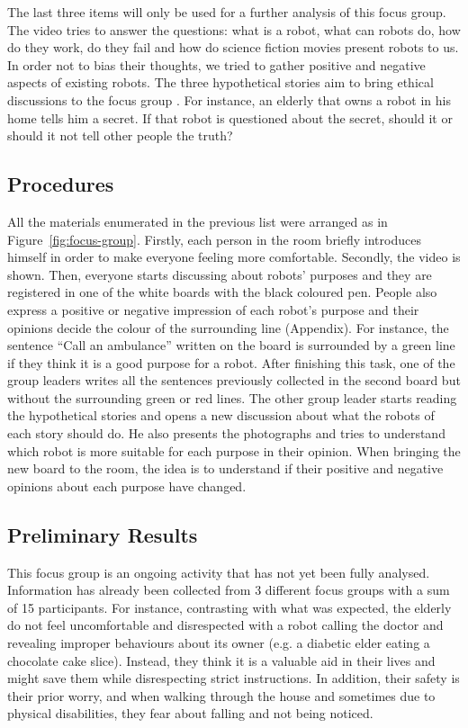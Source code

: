 The last three items will only be used for a further analysis of this focus group.
The video tries to answer the questions: what is a robot, what can robots do, how do they work, do they fail and how do science fiction movies present robots to us.
In order not to bias their thoughts, we tried to gather positive and negative aspects of existing robots.
The three hypothetical stories aim to bring ethical discussions to the focus group \cite{Kahn2006,Should2010}.
For instance, an elderly that owns a robot in his home tells him a secret.
If that robot is questioned about the secret, should it or should it not tell other people the truth?

\subsection{Procedures}
All the materials enumerated in the previous list were arranged as in Figure~\ref{fig:focus-group}.
Firstly, each person in the room briefly introduces himself in order to make everyone feeling more comfortable.
Secondly, the video is shown.
Then, everyone starts discussing about robots' purposes and they are registered in one of the white boards with the black coloured pen.
People also express a positive or negative impression of each robot's purpose and their opinions decide the colour of the surrounding line (Appendix).
For instance, the sentence ``Call an ambulance'' written on the board is surrounded by a green line if they think it is a good purpose for a robot.
After finishing this task, one of the group leaders writes all the sentences previously collected in the second board but without the surrounding green or red lines.
The other group leader starts reading the hypothetical stories and opens a new discussion about what the robots of each story should do.
He also presents the photographs and tries to understand which robot is more suitable for each purpose in their opinion.
When bringing the new board to the room, the idea is to understand if their positive and negative opinions about each purpose have changed.


\subsection{Preliminary Results}

This focus group is an ongoing activity that has not yet been fully analysed.
Information has already been collected from 3 different focus groups with a sum of 15 participants.
For instance, contrasting with what was expected, the elderly do not feel uncomfortable and disrespected with a robot calling the doctor and revealing improper behaviours about its owner (e.g. a diabetic elder eating a chocolate cake slice).
Instead, they think it is a valuable aid in their lives and might save them while disrespecting strict instructions.
In addition, their safety is their prior worry, and when walking through the house and sometimes due to physical disabilities, they fear about falling and not being noticed.




